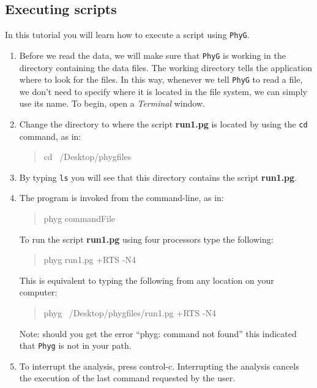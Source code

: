 \documentclass[]{article}
\newcommand{\phyg}{\texttt{PhyG} }
\begin{document}
\subsection{Executing scripts}
\label{subsec:executing}

In this tutorial you will learn how to execute a script using \texttt{PhyG}. 

\begin{enumerate}

\item Before we read the data, we will make sure that \phyg is working in the directory 
containing the data files. The working directory tells the application where to look 
for the files. In this way, whenever we tell \phyg to read a file, we don't need to 
specify where it is located in the file system, we can simply use its name. To 
begin, open a \textit{Terminal} window.
        
\item Change the directory to where the script \textbf{run1.pg} is located by using the 
\texttt{cd} command, as in:
		
	\begin{quote}
	cd ~/Desktop/phygfiles
	\end{quote}
   
\item By typing \texttt{ls} you will see that this directory contains the script 
\textbf{run1.pg}.

\item The program is invoked from the command-line, as in:
		
	\begin{quote}
	phyg commandFile
	\end{quote}
	
To run the script \textbf{run1.pg} using four processors type the following:
		
	\begin{quote}
  	phyg run1.pg +RTS -N4
	\end{quote}
	
This is equivalent to typing the following from any location on your computer:
	
	\begin{quote}
  	phyg ~/Desktop/phygfiles/run1.pg +RTS -N4
	\end{quote}

Note: should you get the error ``phyg: command not found'' this indicated that 
\texttt{Phyg} is not in your path. 
	
\item To interrupt the analysis, press control-c. Interrupting the analysis cancels 
the execution of the last command requested by the user. 

\end{enumerate}
\end{document}
